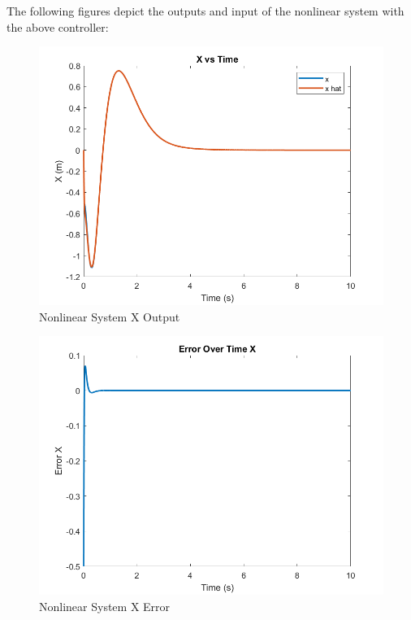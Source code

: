 The following figures depict the outputs and input of the nonlinear system with the above controller:

\begin{figure}[!ht]
    \centering
    \includegraphics[width=\linewidth]{figs/of_nlin_x.png}
    \caption{Nonlinear System X Output}
    \label{}
\end{figure}

\begin{figure}[!ht]
    \centering
    \includegraphics[width=\linewidth]{figs/of_nlin_x_err.png}
    \caption{Nonlinear System X Error}
    \label{}
\end{figure}

